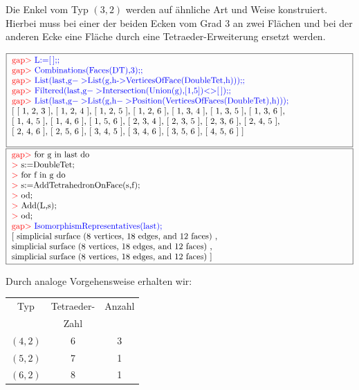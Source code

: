 \documentclass[12pt,titlepage,twoside,cleardoublepage]{article}
\theoremstyle{nummermitklammern}
\numberwithin{equation}{section}
\begin{document}
 Die Enkel vom Typ $(3,2)$ werden auf ähnliche Art und Weise konstruiert. Hierbei muss bei einer der beiden Ecken vom Grad 3 an zwei Flächen und bei der anderen Ecke eine Fläche durch eine Tetraeder-Erweiterung ersetzt werden.
 \begin{center}
 $\fbox{
\parbox{14cm}{
\textcolor{red}{gap$>$} \textcolor{blue}{L:=[\,];;}\newline
\textcolor{red}{gap$>$} \textcolor{blue}{Combinations(Faces(DT),3);;}\newline
\textcolor{red}{gap$>$} \textcolor{blue}{List(last,g$->$List(g,h-$>$VerticesOfFace(DoubleTet,h)));;}\newline
\textcolor{red}{gap$>$} \textcolor{blue}{Filtered(last,g$->$Intersection(Union(g),[1,5])$<>$[\,]);;}\newline
\textcolor{red}{gap$>$} \textcolor{blue}{List(last,g$->$List(g,h$->$Position(VerticesOfFaces(DoubleTet),h)));}\newline
[ [ 1, 2, 3 ], [ 1, 2, 4 ], [ 1, 2, 5 ], [ 1, 2, 6 ], [ 1, 3, 4 ],
  [ 1, 3, 5 ], [ 1, 3, 6 ], \newline
  [ 1, 4, 5 ], [ 1, 4, 6 ], [ 1, 5, 6 ],
  [ 2, 3, 4 ], [ 2, 3, 5 ], [ 2, 3, 6 ], [ 2, 4, 5 ], 
 \newline
  [ 2, 4, 6 ], [ 2, 5, 6 ], [ 3, 4, 5 ], [ 3, 4, 6 ], [ 3, 5, 6 ], [ 4, 5, 6 ] ]\newline
}}$
 $\fbox{
\parbox{14cm}{
\textcolor{red}{gap$>$} for g in last do\newline
\textcolor{red}{$>$} s:=DoubleTet;\newline
\textcolor{red}{$>$} for f in g do\newline
\textcolor{red}{$>$} s:=AddTetrahedronOnFace(s,f);\newline
\textcolor{red}{$>$} od;\newline
\textcolor{red}{$>$} Add(L,s);\newline
\textcolor{red}{$>$} od;\newline
\textcolor{red}{gap$>$} \textcolor{blue}{IsomorphismRepresentatives(last);}\newline
[ simplicial surface (8 vertices, 18 edges, and 12 faces)
    ,\newline
     simplicial surface (8 vertices, 18 edges, and 12 faces)
    ,\newline
  simplicial surface (8 vertices, 18 edges, and 12 faces)
 ]
}}$ 
\end{center}  
Durch analoge Vorgehensweise erhalten wir:
\begin{center}
\begin{tabular}{|c|c|c|}
\hline
 Typ&Tetraeder-  & Anzahl\\
&Zahl &\\
\hline
$(4,2)$&6& 3\\
\hline
$(5,2)$&7& 1\\
\hline
$(6,2)$&8& 1\\
\hline
\end{tabular}
\end{center}
\end{document}
